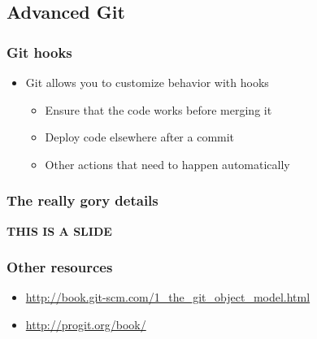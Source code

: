 \documentclass{beamer}
\begin{document}
\subsection{Advanced Git}

\begin{frame}
  \frametitle{Git hooks}
  \begin{itemize}
    \item Git allows you to customize behavior with hooks
      \begin{itemize}
        \item Ensure that the code works before merging it
        \item Deploy code elsewhere after a commit
        \item Other actions that need to happen automatically
      \end{itemize}
  \end{itemize}
\end{frame}

\begin{frame}
  \frametitle{The really gory details}
  {\bf THIS IS A SLIDE}
\end{frame}

\begin{frame}
  \frametitle{Other resources}
  \begin{itemize}
    \item \url{http://book.git-scm.com/1\_the\_git\_object\_model.html}
    \item \url{http://progit.org/book/}
  \end{itemize}
\end{frame}
\end{document}
